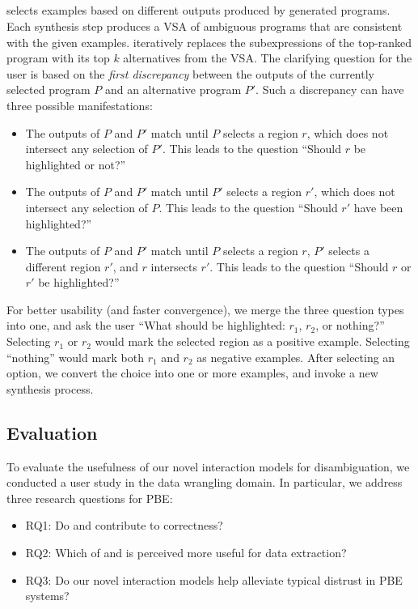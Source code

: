 \subsection{\ConversationalClarification}
\ConversationalClarification selects examples based on different outputs produced by generated programs.
Each synthesis step produces a VSA of ambiguous programs that are consistent with the given examples.
\ConversationalClarification iteratively replaces the subexpressions of the top-ranked program with its top $k$
alternatives from the VSA.
The clarifying question for the user is based on the \emph{first discrepancy} between the outputs of the currently
selected program $P$ and an alternative program $P'$.
Such a discrepancy can have three possible manifestations:
\begin{itemize}[nosep]
    \item The outputs of $P$ and $P'$ match until $P$ selects a region $r$, which does not intersect any selection of
        $P'$.
        This leads to the question ``Should $r$ be highlighted or not?''
    \item The outputs of $P$ and $P'$ match until $P'$ selects a region $r'$, which does not intersect any selection of
        $P$.
        This leads to the question ``Should $r'$ have been highlighted?''
    \item The outputs of $P$ and $P'$ match until $P$ selects a region $r$, $P'$ selects a different region $r'$, and
        $r$ intersects
        $r'$.
        This leads to the question ``Should $r$ or $r'$ be highlighted?''
\end{itemize}
For better usability (and faster convergence), we merge the three question types into
one, and ask the user ``What should be highlighted: $r_1$, $r_2$, or nothing?''
Selecting $r_1$ or $r_2$ would mark the selected region as a positive example.
Selecting ``nothing'' would mark both $r_1$ and $r_2$ as negative examples.
After selecting an option, we convert the choice into one or more examples, and invoke a new synthesis process.

\subsection{Evaluation}


To evaluate the usefulness of our novel interaction models for disambiguation, we conducted a user study in the data
wrangling domain.
In particular, we address three research questions for PBE:
\newcommand{\RQOneShort}{RQ1}
\newcommand{\RQTwoShort}{RQ2}
\newcommand{\RQThreeShort}{RQ3}
\newcommand{\RQOne}{Do \ProgramNavigation and \ConversationalClarification contribute to correctness?}
\newcommand{\RQTwo}{Which of \ProgramNavigation and \ConversationalClarification is perceived more useful for data extraction?}
\newcommand{\RQThree}{Do our novel interaction models help alleviate typical distrust in PBE systems?}
\begin{itemize}[nosep]
    \item \RQOneShort: \RQOne
    \item \RQTwoShort: \RQTwo
    \item \RQThreeShort: \RQThree
\end{itemize}

